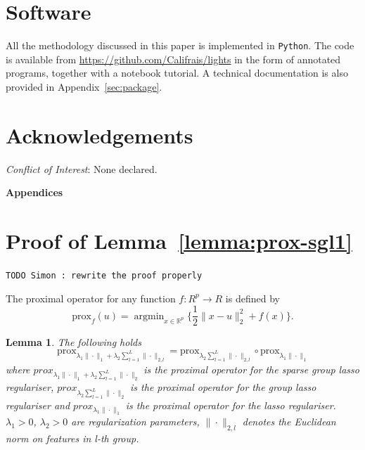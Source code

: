 \documentclass[11pt]{article}
\newtheorem{lemma}{Lemma}
\DeclareMathOperator{\argmin}{argmin}
\newcommand{\norm}[1]{\|#1\|}
\newcommand{\R}{\mathds R}
\begin{document}
\section*{Software}
All the methodology discussed in this paper is implemented in \texttt{Python}. The code is available from \url{https://github.com/Califrais/lights} in the form of annotated programs, together with a notebook tutorial. A technical documentation is also provided in Appendix~\ref{sec:package}.

\section*{Acknowledgements}
\textit{Conflict of Interest}: None declared.

\appendix

\begin{center}
\LARGE \textbf{Appendices}
\end{center}

\section{Proof of Lemma~\ref{lemma:prox-sgl1}}
\label{sec:proof-lemma-prox-sgl1}

\texttt{TODO Simon : rewrite the proof properly}

The proximal operator for any function $f : R^p \to R$ is defined by
\begin{equation}
    \label{eq:prox-def}
    \text{prox}_{f}(u) = \argmin_{x \in \R^p} \{\frac{1}{2}\norm{x - u}_2^2 + f(x)\}.
\end{equation}
\begin{lemma} 
The following holds
\begin{equation*}
    \text{prox}_{\lambda_1 \norm{\cdot}_1 + \lambda_2 \sum_{l=1}^L  \norm{\cdot}_{2,l}}
    = \text{prox}_{\lambda_2 \sum_{l=1}^L \norm{\cdot}_{2,l}} \circ \text{prox}_{\lambda_1 \norm{\cdot}_1}
\end{equation*}
where $prox_{\lambda_1 \norm{\cdot}_1 + \lambda_2 \sum_{l=1}^L \norm{\cdot}_2}$ is the proximal operator for the sparse group lasso regulariser, $prox_{\lambda_2 \sum_{l=1}^L \norm{\cdot}_2}$ is the proximal operator for the group lasso regulariser and $prox_{\lambda_1 \norm{\cdot}_1}$ is the proximal operator for the lasso regulariser. $\lambda_1 > 0$, $\lambda_2 > 0$ are regularization parameters, $\norm{\cdot}_{2,l}$ denotes the Euclidean norm on features in l-th group.
\end{lemma}
\end{document}

